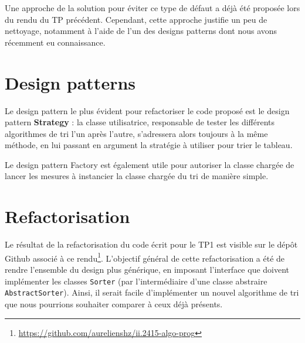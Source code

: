     Une approche de la solution pour éviter ce type de défaut a déjà été proposée lors du rendu du TP précédent.
    Cependant, cette approche justifie un peu de nettoyage, notamment à l'aide de l'un des designs patterns dont
    nous avons récemment eu connaissance.

  \section{Design patterns}

    Le design pattern le plus évident pour refactoriser le code proposé est le design pattern \textbf{Strategy} :
    la classe utilisatrice, responsable de tester les différents algorithmes de tri l'un après l'autre,
    s'adressera alors toujours à la même méthode, en lui passant en argument la stratégie à utiliser pour
    trier le tableau.

    Le design pattern Factory est également utile pour autoriser la classe chargée de lancer les mesures à
    instancier la classe chargée du tri de manière simple.

  \section{Refactorisation}

    Le résultat de la refactorisation du code écrit pour le TP1 est visible sur le dépôt Github associé
    à ce rendu\footnote{\url{https://github.com/aurelienshz/ii.2415-algo-prog}}.
    L'objectif général de cette refactorisation a été de rendre l'ensemble du design plus générique,
    en imposant l'interface que doivent implémenter les classes \texttt{Sorter}
    (par l'intermédiaire d'une classe abstraire \texttt{AbstractSorter}). Ainsi, il serait facile d'implémenter
    un nouvel algorithme de tri que nous pourrions souhaiter comparer à ceux déjà présents.
